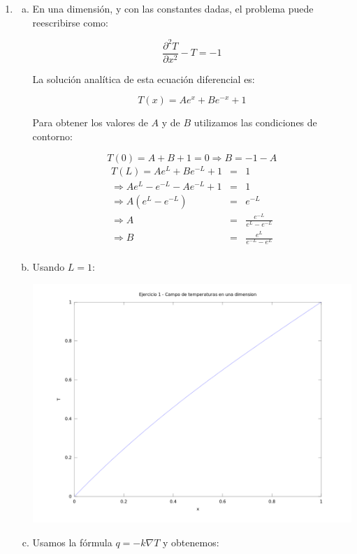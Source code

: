 \documentclass{article}
\begin{document}
\begin{enumerate}[1)]
\item{%
    \begin{enumerate}[a)]
    \item{%
        En una dimensión, y con las constantes dadas, el problema puede reescribirse como:

        \[ \frac{\partial^2 T}{\partial x^2} - T = -1 \]

        La solución analítica de esta ecuación diferencial es:

        \[ T(x) = A e^x + B e^{-x} + 1 \]

        Para obtener los valores de $A$ y de $B$ utilizamos las condiciones de contorno:

        \[ T(0) = A + B + 1 = 0 \Rightarrow B = -1 - A \]
        \begin{eqnarray*} 
            T(L) = A e^L + B e^{-L} + 1 &=& 1 \\
            \Rightarrow A e^L - e^{-L}  - A e^{-L} + 1 &=& 1 \\
            \Rightarrow A \left(e^L - e^{-L}\right) &=& e^{-L} \\
            \Rightarrow A  &=& \frac{e^{-L}}{e^L - e^{-L}} \\
            \Rightarrow B  &=& \frac{e^{L}}{e^{-L} - e^L} \\
        \end{eqnarray*}
    }
    \item{%
        Usando $L=1$:

        \includegraphics[width=\textwidth]{ej1_campo_temperatura.png}
    }
    \item{%
        Usamos la fórmula $q = -k \nabla T$ y obtenemos:

}
\end{enumerate}}
\end{enumerate}
\end{document}
